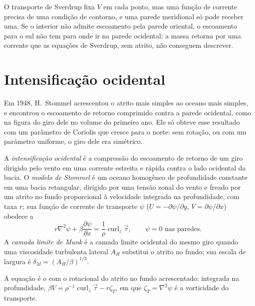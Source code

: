 O transporte de Sverdrup fixa $V$ em cada ponto, mas uma função de corrente
precisa de uma condição de contorno, e uma parede meridional só pode receber uma. Se o
interior não admite escoamento pela parede oriental, o escoamento para o sul
não tem para onde ir na parede ocidental; a massa retorna por uma corrente
que as equações de Sverdrup, sem atrito, não conseguem descrever.

\section{Intensificação ocidental}\label{sec:b3:ocean-dynamics:western}

Em 1948, H.~Stommel acrescentou o atrito mais simples ao oceano mais simples, e
encontrou o escoamento de retorno comprimido contra a parede ocidental, como na
figura do giro dele no volume do primeiro ano. Ele só obteve esse resultado com um parâmetro de Coriolis
que cresce para o norte: sem rotação, ou com um parâmetro uniforme,
o giro dele era simétrico.

\begin{definition}\label{def:b3:ocean-dynamics:western-intensification}
A \emph{intensificação ocidental} é a
compressão do escoamento de retorno de um giro dirigido pelo vento em uma corrente estreita e
rápida contra o lado ocidental da bacia. O \emph{modelo de Stommel
} é um oceano homogêneo de profundidade constante em uma
bacia retangular, dirigido por uma tensão zonal do vento e freado por um atrito no fundo
proporcional à velocidade integrada na profundidade, com taxa $r$;
sua função de corrente de transporte $\psi$ ($U = -\partial\psi/\partial y$, $V =
\partial\psi/\partial x$) obedece a
\[
r\nabla^2\psi + \beta\frac{\partial\psi}{\partial x} =
\frac{1}{\rho}\operatorname{curl}_z\vec\tau ,\qquad \psi = 0 \text{ nas paredes.}
\]
A \emph{camada limite de Munk} é a
camada limite ocidental do mesmo giro quando uma viscosidade turbulenta lateral $A_H$
substitui o atrito no fundo; sua escala de largura é $\delta_M =
(A_H/\beta)^{1/3}$.
\end{definition}

A equação é o  com o rotacional do atrito no fundo
acrescentado: integrada na profundidade, $\beta V = \rho^{-1}\operatorname{curl}_z
\vec\tau - r\zeta_T$, em que $\zeta_T = \nabla^2\psi$ é a vorticidade do
transporte.

